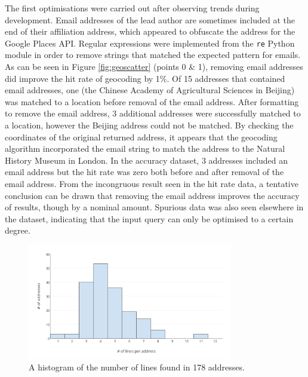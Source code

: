 \documentclass[Report.tex]{subfiles}
\begin{document}
\noindent The first optimisations were carried out after observing trends during development. Email addresses of the lead author are sometimes included at the end of their affiliation address, which appeared to obfuscate the address for the Google Places API. Regular expressions were implemented from the \texttt{re} Python module in order to remove strings that matched the expected pattern for emails. As can be seen in Figure \ref{fig:geoscatter} (points 0 \& 1), removing email addresses did improve the hit rate of geocoding by 1\%. Of 15 addresses that contained email addresses, one (the Chinese Academy of Agricultural Sciences in Beijing) was matched to a location before removal of the email address. After formatting to remove the email address, 3 additional addresses were successfully matched to a location, however the Beijing address could not be matched. By checking the coordinates of the original returned address, it appears that the geocoding algorithm incorporated the email string to match the address to the Natural History Museum in London. In the accuracy dataset, 3 addresses included an email address but the hit rate was zero both before and after removal of the email address. From the incongruous result seen in the hit rate data, a tentative conclusion can be drawn that removing the email address improves the accuracy of results, though by a nominal amount. Spurious data was also seen elsewhere in the dataset, indicating that the input query can only be optimised to a certain degree.

\begin{figure}[!ht]
\begin{center}
	\includegraphics[width=0.8\textwidth]{../lib/images/address-lines-histogram}
	\caption{A histogram of the number of lines found in 178 addresses.\label{fig:addresslines}}
\end{center}
\end{figure}
\end{document}
